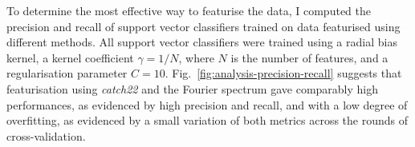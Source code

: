 
To determine the most effective way to featurise the data, I computed the precision and recall of support vector classifiers trained on data featurised using different methods.
All support vector classifiers were trained using a radial bias kernel, a kernel coefficient $\gamma = 1/N$, where $N$ is the number of features, and a regularisation parameter $C = 10$.
Fig.\ \ref{fig:analysis-precision-recall} suggests that featurisation using \textit{catch22} and the Fourier spectrum gave comparably high performances, as evidenced by high precision and recall, and with a low degree of overfitting, as evidenced by a small variation of both metrics across the rounds of cross-validation.



